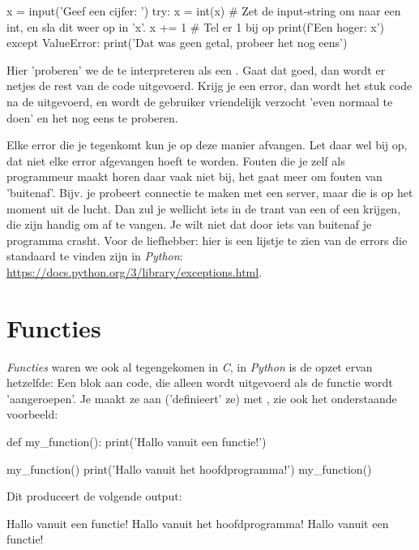 \begin{python}
x = input('Geef een cijfer: ')
try:
	x = int(x)  # Zet de input-string om naar een int, en sla dit weer op in 'x'.
	x += 1  # Tel er 1 bij op
	print(f'Een hoger: {x}')
except ValueError:
    print('Dat was geen getal, probeer het nog eens')
\end{python}

Hier 'proberen' we de  te interpreteren als een . Gaat dat goed, dan wordt er netjes de rest van de code uitgevoerd. Krijg je een error, dan wordt het stuk code na de  uitgevoerd, en wordt de gebruiker vriendelijk verzocht 'even normaal te doen' en het nog eens te proberen. \newline

Elke error die je tegenkomt kun je op deze manier afvangen. Let daar wel bij op, dat niet elke error afgevangen hoeft te worden. Fouten die je zelf als programmeur maakt horen daar vaak niet bij, het gaat meer om fouten van 'buitenaf'. Bijv. je probeert connectie te maken met een server, maar die is op het moment uit de lucht. Dan zul je wellicht iets in de trant van een  of een  krijgen, die zijn handig om af te vangen. Je wilt niet dat door iets van buitenaf je programma crasht. Voor de liefhebber: hier is een lijstje te zien van de errors die standaard te vinden zijn in \textit{Python}: \url{https://docs.python.org/3/library/exceptions.html}.

\newpage

\section{Functies}
\textit{Functies} waren we ook al tegengekomen in \textit{C}, in \textit{Python} is de opzet ervan hetzelfde: Een blok aan code, die alleen wordt uitgevoerd als de functie wordt 'aangeroepen'. Je maakt ze aan ('definieert' ze) met , zie ook het onderstaande voorbeeld:

\begin{python}
def my_function():
    print('Hallo vanuit een functie!') 

my_function()
print('Hallo vanuit het hoofdprogramma!')
my_function()
\end{python}

Dit produceert de volgende output:

\begin{python}
Hallo vanuit een functie!
Hallo vanuit het hoofdprogramma!
Hallo vanuit een functie!
\end{python}

